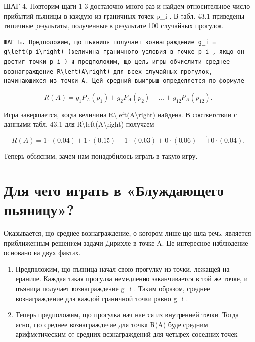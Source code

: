 \documentclass[
]{article}
\begin{document}
ШАГ 4. Повторим щаги 1-3 достаточно много раз и найдем относительное
число прибытий пьяницы в каждую из граничных точек p\_i . В табл. 43.1
приведены типичные результаты, полученные в результате 100 случайных
прогулок.

\begin{verbatim}
ШАГ Б. Предположим, що пьяница получает вознаграждение g_i = g\left(p_i\right) (величина граничного условия в точке p_i , якщо он достиг точки p_i ) и предположим, що цель игры—обчислити среднее вознаграждение R\left(A\right) для всех случайных прогулок, начинающихся из точки A. Цей средний выигрыш определяется по формуле
\end{verbatim}

\[
R(A) = g_1 P_A(p_1) + g_2 P_A(p_2) + \dots + g_{12} P_A(p_{12}).
\]

Игра завершается, когда величина
R\textbackslash left(A\textbackslash right) найдена. В соответствии с
данными табл. 43.1 для R\textbackslash left(A\textbackslash right)
получаем

\[
R(A) = 1 \cdot (0.04) + 1 \cdot (0.15) + 1 \cdot (0.03) + 0 \cdot (0.06) + \dot + 0 \cdot (0.04).
\]

Теперь объясним, зачем нам понадобилось играть в такую игру.

\section{Для чего играть в «Блуждающего
пьяницу»?}\label{ux434ux43bux44f-ux447ux435ux433ux43e-ux438ux433ux440ux430ux442ux44c-ux432-ux431ux43bux443ux436ux434ux430ux44eux449ux435ux433ux43e-ux43fux44cux44fux43dux438ux446ux443}

Оказывается, що среднее вознаграждение, о котором лише що шла речь,
является приближенным решением задачи Дирихле в точке A. Це интересное
наблюдение основано на двух фактах.

\begin{enumerate}
\def\labelenumi{\arabic{enumi}.}
\item
  Предположим, що пъяница начал свою прогулку из точки, лежащей на
  еранице. Каждая такая прогулка немедленно заканчивается в той же
  точке, и пъяница получает вознаграждение g\_i . Таким образом, среднее
  вознаграждение для каждой граничной точки равно g\_i .
\item
  Теперь предположим, що прогулка нач нается из внутренней точки. Тогда
  ясно, що среднее вознаграждечие для точки R(A) буде средним
  арифметическим от средних вознаграждений для четырех соседних точек
\end{enumerate}
\end{document}
